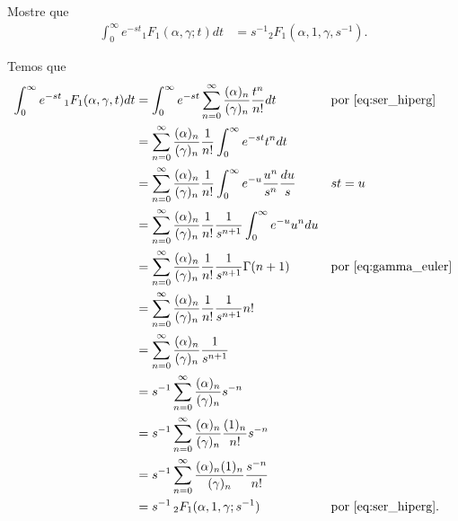 \documentclass[a4paper,12pt, leqno, answers]{exam}
\begin{document}
\begin{questions}
    \question[Exame de 2006] Mostre que
    \begin{align*}
        \int_0^\infty e^{-s t} {}_1F_1(\alpha, \gamma; t) dt &= s^{-1} {}_2F_1(\alpha, 1, \gamma, s^{-1}).
    \end{align*}
    \begin{solution}
        Temos que
        \begin{align*}
            \int_0^\infty e^{-st} \,_1F_1(\alpha, \gamma, t) dt &= \int_0^\infty e^{-st} \sum_{n = 0}^\infty \frac{(\alpha)_n}{(\gamma)_n} \frac{t^n}{n!} dt && \text{por \eqref{eq:ser_hiperg}} \\
            &= \sum_{n = 0}^\infty \frac{(\alpha)_n}{(\gamma)_n} \frac{1}{n!} \int_0^\infty e^{-st} t^n dt \\
            &= \sum_{n = 0}^\infty \frac{(\alpha)_n}{(\gamma)_n} \frac{1}{n!} \int_0^\infty e^{-u} \frac{u^n}{s^n} \frac{du}{s} && st = u \\
            &= \sum_{n = 0}^\infty \frac{(\alpha)_n}{(\gamma)_n} \frac{1}{n!} \frac{1}{s^{n + 1}} \int_0^\infty e^{-u} u^n du \\
            &= \sum_{n = 0}^\infty \frac{(\alpha)_n}{(\gamma)_n} \frac{1}{n!} \frac{1}{s^{n + 1}} \Gamma(n + 1) && \text{por \eqref{eq:gamma_euler}} \\
            &= \sum_{n = 0}^\infty \frac{(\alpha)_n}{(\gamma)_n} \frac{1}{n!} \frac{1}{s^{n + 1}} n! \\
            &= \sum_{n = 0}^\infty \frac{(\alpha)_n}{(\gamma)_n} \frac{1}{s^{n + 1}} \\
            &= s^{-1} \sum_{n = 0}^\infty \frac{(\alpha)_n}{(\gamma)_n} s^{-n} \\
            &= s^{-1} \sum_{n = 0}^\infty \frac{(\alpha)_n}{(\gamma)_n} \frac{(1)_n}{n!} s^{-n} \\
            &= s^{-1} \sum_{n = 0}^\infty \frac{(\alpha)_n (1)_n}{(\gamma)_n} \frac{s^{-n}}{n!} \\
            &= s^{-1} \,_2F_1(\alpha, 1, \gamma; s^{-1}) && \text{por \eqref{eq:ser_hiperg}}.
        \end{align*}
    \end{solution}


\end{questions}
\end{document}
